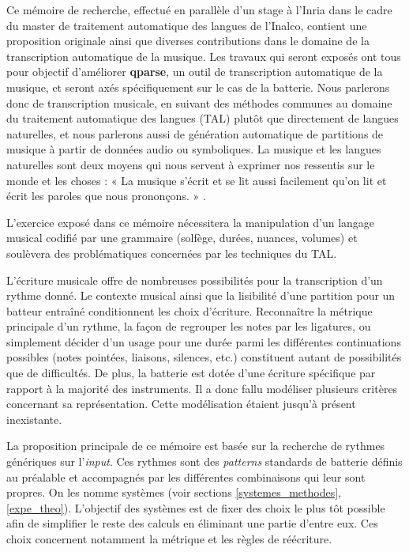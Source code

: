 Ce mémoire de recherche, effectué en parallèle d’un stage à l’Inria dans le
cadre du master de traitement automatique des langues de l’Inalco, contient
une proposition originale ainsi que diverses contributions dans le domaine de
la transcription automatique de la musique. Les travaux qui seront exposés ont
tous pour objectif d’améliorer \textbf{qparse}, un outil de transcription
automatique de la musique, et seront axés spécifiquement sur le cas de la
batterie. Nous parlerons donc de transcription musicale, en suivant des
méthodes communes au domaine du traitement automatique des langues (TAL) plutôt
que directement de langues naturelles, et nous parlerons aussi de génération
automatique de partitions de musique à partir de données audio ou symboliques.
La musique et les langues naturelles sont deux moyens qui nous servent à
exprimer nos ressentis sur le monde et les choses : « La musique s’écrit et se
lit aussi facilement qu’on lit et écrit les paroles que nous prononçons. »
\cite{danhauser}.

L’exercice exposé dans ce mémoire nécessitera la manipulation
d’un langage musical codifié par une grammaire (solfège, durées, nuances,
volumes) et soulèvera des problématiques concernées par les techniques du TAL.

L’écriture musicale offre de nombreuses possibilités pour la transcription d’un
rythme donné. Le contexte musical ainsi que la lisibilité d’une partition pour
un batteur entraîné conditionnent les choix d’écriture. Reconnaître la
métrique principale d’un rythme, la façon de regrouper les notes par les
ligatures, ou simplement décider d’un usage pour une durée parmi les
différentes continuations possibles (notes pointées, liaisons, silences, etc.)
constituent autant de possibilités que de difficultés. De plus, la batterie
est dotée d’une écriture spécifique par rapport à la majorité des
instruments. Il a donc fallu modéliser plusieurs critères concernant sa
représentation. Cette modélisation étaient jusqu’à présent inexistante.





La proposition principale de ce mémoire est basée sur la recherche de rythmes
génériques sur l’\textit{input}. Ces rythmes sont des \textit{patterns}
standards de batterie définis au préalable et accompagnés par les différentes
combinaisons qui leur sont propres. On les nomme systèmes (voir sections
\ref{systemes_methodes}, \ref{expe_theo}). L’objectif des systèmes est de fixer
des choix le plus tôt possible afin de simplifier le reste des calculs en
éliminant une partie d’entre eux. Ces choix concernent notamment la métrique
et les règles de réécriture.

